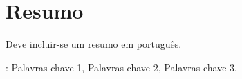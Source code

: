 \chapter*{Resumo}\label{resumo}
\pagestyle{MyThesisStyle}



Deve incluir-se um resumo em português.

\vfill
{}: Palavras-chave 1, Palavras-chave 2, Palavras-chave 3.
